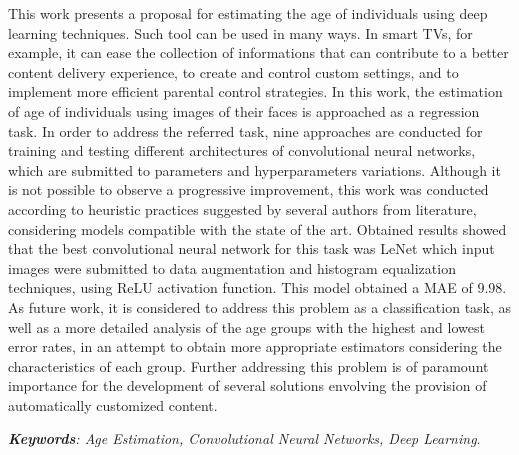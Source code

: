 
  This work presents a proposal for estimating the age of individuals using deep learning techniques. Such tool can be used in many ways. In smart TVs, for example, it can ease the collection of informations that can contribute to a better content delivery experience, to create and control custom settings, and to implement more efficient parental control strategies. In this work, the estimation of age of individuals using images of their faces is approached as a regression task. In order to address the referred task, nine approaches are conducted for training and testing different architectures of convolutional neural networks, which are submitted to parameters and hyperparameters variations. Although it is not possible to observe a progressive improvement, this work was conducted according to heuristic practices suggested by several authors from literature, considering models compatible with the state of the art. Obtained results showed that the best convolutional neural network for this task was LeNet which input images were submitted to data augmentation and histogram equalization techniques, using ReLU activation function. This model obtained a MAE of $9.98$. As future work, it is considered to address this problem as a classification task, as well as a more detailed analysis of the age groups with the highest and lowest error rates, in an attempt to obtain more appropriate estimators considering the characteristics of each group. Further addressing this problem is of paramount importance for the development of several solutions envolving the provision of automatically customized content.

  \noindent \emph{\textbf{Keywords}: Age Estimation, Convolutional Neural Networks, Deep Learning}.
